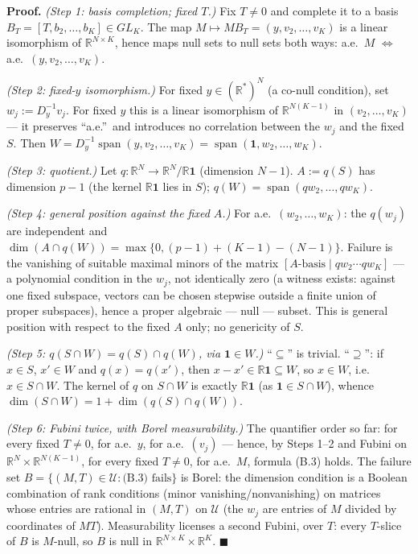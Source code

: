 \noindent\textbf{Proof.} \emph{(Step 1: basis completion; fixed $T$.)} Fix $T\neq0$ and complete it to a basis $B_T=[T,b_2,\dots,b_K]\in GL_K$. The map $M\mapsto MB_T=(y,v_2,\dots,v_K)$ is a linear isomorphism of $\mathbb R^{N\times K}$, hence maps null sets to null sets both ways: a.e.\ $M$ $\Leftrightarrow$ a.e.\ $(y,v_2,\dots,v_K)$.

\emph{(Step 2: fixed-$y$ isomorphism.)} For fixed $y\in(\mathbb R^*)^N$ (a co-null condition), set $w_j:=D_y^{-1}v_j$. For fixed $y$ this is a linear isomorphism of $\mathbb R^{N(K-1)}$ in $(v_2,\dots,v_K)$ --- it preserves ``a.e.''\ and introduces no correlation between the $w_j$ and the fixed $S$. Then $W=D_y^{-1}\operatorname{span}(y,v_2,\dots,v_K)=\operatorname{span}(\mathbf 1,w_2,\dots,w_K)$.

\emph{(Step 3: quotient.)} Let $q:\mathbb R^N\to\mathbb R^N/\mathbb R\mathbf 1$ (dimension $N-1$). $A:=q(S)$ has dimension $p-1$ (the kernel $\mathbb R\mathbf 1$ lies in $S$); $q(W)=\operatorname{span}(qw_2,\dots,qw_K)$.

\emph{(Step 4: general position against the fixed $A$.)} For a.e.\ $(w_2,\dots,w_K)$: the $q(w_j)$ are independent and $\dim(A\cap q(W))=\max\{0,(p-1)+(K-1)-(N-1)\}$. Failure is the vanishing of suitable maximal minors of the matrix $[A\text{-basis}\mid qw_2\cdots qw_K]$ --- a polynomial condition in the $w_j$, not identically zero (a witness exists: against one fixed subspace, vectors can be chosen stepwise outside a finite union of proper subspaces), hence a proper algebraic --- null --- subset. This is general position with respect to the fixed $A$ only; no genericity of $S$.

\emph{(Step 5: $q(S\cap W)=q(S)\cap q(W)$, via $\mathbf 1\in W$.)} ``$\subseteq$'' is trivial. ``$\supseteq$'': if $x\in S$, $x'\in W$ and $q(x)=q(x')$, then $x-x'\in\mathbb R\mathbf 1\subseteq W$, so $x\in W$, i.e.\ $x\in S\cap W$. The kernel of $q$ on $S\cap W$ is exactly $\mathbb R\mathbf 1$ (as $\mathbf 1\in S\cap W$), whence $\dim(S\cap W)=1+\dim(q(S)\cap q(W))$.

\emph{(Step 6: Fubini twice, with Borel measurability.)} The quantifier order so far: for every fixed $T\neq0$, for a.e.\ $y$, for a.e.\ $(v_j)$ --- hence, by Steps 1--2 and Fubini on $\mathbb R^N\times\mathbb R^{N(K-1)}$, for every fixed $T\neq0$, for a.e.\ $M$, formula (B.3) holds. The failure set $B=\{(M,T)\in\mathcal U:\text{(B.3) fails}\}$ is Borel: the dimension condition is a Boolean combination of rank conditions (minor vanishing/nonvanishing) on matrices whose entries are rational in $(M,T)$ on $\mathcal U$ (the $w_j$ are entries of $M$ divided by coordinates of $MT$). Measurability licenses a second Fubini, over $T$: every $T$-slice of $B$ is $M$-null, so $B$ is null in $\mathbb R^{N\times K}\times\mathbb R^K$. \hfill$\blacksquare$

